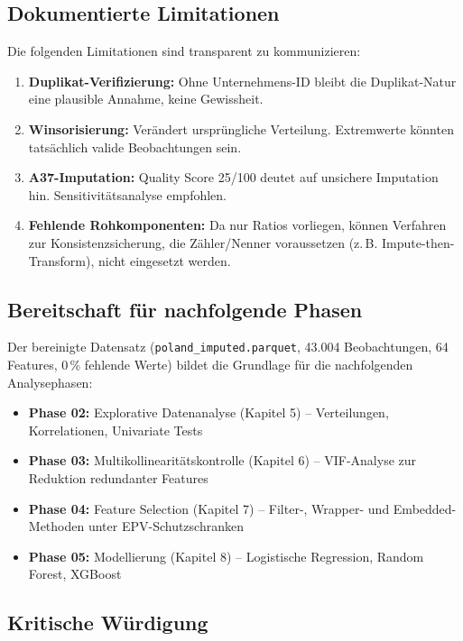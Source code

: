 \subsection{Dokumentierte Limitationen}

Die folgenden Limitationen sind transparent zu kommunizieren:

\begin{enumerate}[topsep=0.2\baselineskip]
    \item \textbf{Duplikat-Verifizierung:} Ohne Unternehmens-ID bleibt die Duplikat-Natur eine plausible Annahme, keine Gewissheit.
    \item \textbf{Winsorisierung:} Verändert ursprüngliche Verteilung. Extremwerte könnten tatsächlich valide Beobachtungen sein.
    \item \textbf{A37-Imputation:} Quality Score 25/100 deutet auf unsichere Imputation hin. Sensitivitätsanalyse empfohlen.
    \item \textbf{Fehlende Rohkomponenten:} Da nur Ratios vorliegen, können Verfahren zur Konsistenzsicherung, die Zähler/Nenner voraussetzen (z.\,B. Impute-then-Transform), nicht eingesetzt werden.
\end{enumerate}

\subsection{Bereitschaft für nachfolgende Phasen}

Der bereinigte Datensatz (\texttt{poland\_imputed.parquet}, 43.004 Beobachtungen, 64 Features, 0\,\% fehlende Werte) bildet die Grundlage für die nachfolgenden Analysephasen:

\begin{itemize}[topsep=0.2\baselineskip]
    \item \textbf{Phase 02:} Explorative Datenanalyse (Kapitel 5) – Verteilungen, Korrelationen, Univariate Tests
    \item \textbf{Phase 03:} Multikollinearitätskontrolle (Kapitel 6) – VIF-Analyse zur Reduktion redundanter Features
    \item \textbf{Phase 04:} Feature Selection (Kapitel 7) – Filter-, Wrapper- und Embedded-Methoden unter EPV-Schutzschranken
    \item \textbf{Phase 05:} Modellierung (Kapitel 8) – Logistische Regression, Random Forest, XGBoost
\end{itemize}

\subsection{Kritische Würdigung}

